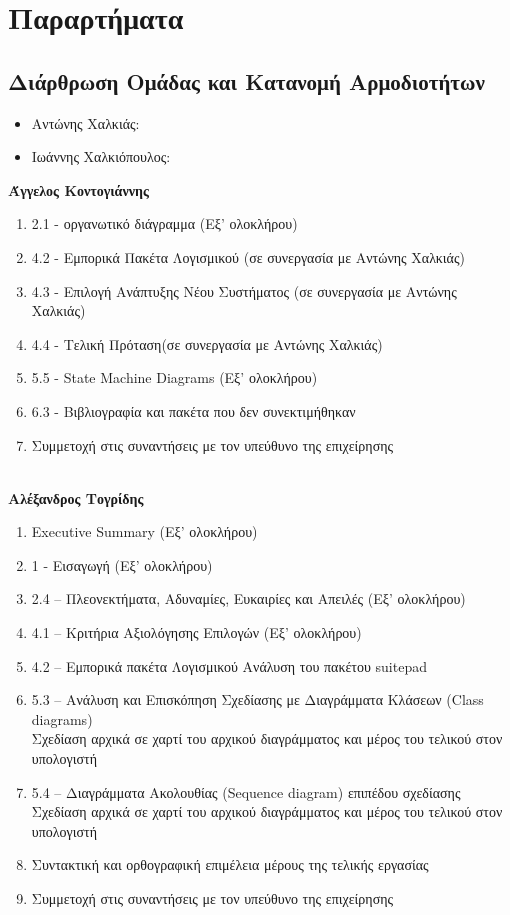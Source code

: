 \chapter{Παραρτήματα}
		
\section{Διάρθρωση Ομάδας και Κατανομή Αρμοδιοτήτων}
\begin{itemize}
	\item Αντώνης Χαλκιάς:
	\item Ιωάννης Χαλκιόπουλος:
\end{itemize}


\noindent
\textbf{Άγγελος Κοντογιάννης}
\begin{enumerate}
	\item 2.1 - οργανωτικό διάγραμμα (Εξ’ ολοκλήρου)
	\item 4.2 - Εμπορικά Πακέτα Λογισμικού (σε συνεργασία με Αντώνης Χαλκιάς)
	\item 4.3 - Επιλογή Ανάπτυξης Νέου Συστήματος (σε συνεργασία με Αντώνης Χαλκιάς)
	\item 4.4 - Τελική Πρόταση(σε συνεργασία με Αντώνης Χαλκιάς)
	\item 5.5 - State Machine Diagrams (Εξ’ ολοκλήρου)
	\item 6.3 - Βιβλιογραφία και πακέτα που δεν συνεκτιμήθηκαν
	\item Συμμετοχή στις συναντήσεις με τον υπεύθυνο της επιχείρησης
\end{enumerate}

\noindent
\\\textbf{Αλέξανδρος Τογρίδης}
\begin{enumerate}
	\item Εxecutive Summary (Εξ’ ολοκλήρου)
	\item 1 - Εισαγωγή (Εξ’ ολοκλήρου)
	\item 2.4 – Πλεονεκτήματα, Αδυναμίες, Ευκαιρίες και Απειλές (Εξ’ ολοκλήρου)
	\item 4.1 – Κριτήρια Αξιολόγησης Επιλογών (Εξ’ ολοκλήρου)
	\item 4.2 – Εμπορικά πακέτα Λογισμικού  Ανάλυση του πακέτου suitepad
	\item5.3 – Ανάλυση και Επισκόπηση Σχεδίασης με Διαγράμματα Κλάσεων (Class diagrams) \\
	Σχεδίαση αρχικά σε χαρτί του αρχικού διαγράμματος και μέρος του τελικού στον υπολογιστή
	\item 5.4 – Διαγράμματα Ακολουθίας (Sequence diagram) επιπέδου σχεδίασης  
	Σχεδίαση αρχικά σε χαρτί του αρχικού διαγράμματος και μέρος του τελικού στον υπολογιστή
	\item Συντακτική και ορθογραφική επιμέλεια μέρους της τελικής εργασίας
	\item Συμμετοχή στις συναντήσεις με τον υπεύθυνο της επιχείρησης
\end{enumerate}

